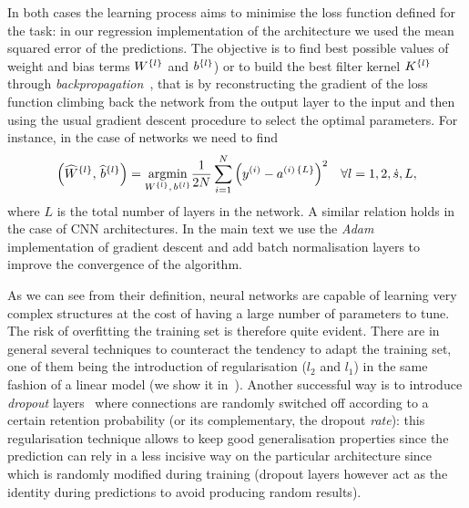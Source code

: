 In both cases the learning process aims to minimise the loss function defined for the task: in our regression implementation of the architecture we used the mean squared error of the predictions.
The objective is to find best possible values of weight and bias terms $W^{\qty{l}}$ and $b^{\qty{l}}$) or to build the best filter kernel $K^{\qty{l}}$ through \textit{backpropagation}~\cite{Rumelhart:1986:LearningRepresentationsBackpropagating}, that is by reconstructing the gradient of the loss function climbing back the network from the output layer to the input and then using the usual gradient descent procedure to select the optimal parameters.
For instance, in the case of \fc networks we need to find
\begin{equation}
  \qty( \widehat{W}^{\qty{l}},\, \widehat{b}^{\qty{l}} )
  =
  \underset{W^{\qty{l}},\, b^{\qty{l}}}{\mathrm{argmin}} \frac{1}{2 N} \sum\limits_{i = 1}^{N} \qty( y^{(i)} - a^{(i)\, \qty{L}} )^2
  \quad
  \forall l = 1, 2, \dot{s}, L,
\end{equation}
where $L$ is the total number of layers in the network.
A similar relation holds in the case of CNN architectures.
In the main text we use the \textit{Adam}~\cite{Kingma:2017:AdamMethodStochastic} implementation of gradient descent and add batch normalisation layers to improve the convergence of the algorithm.

As we can see from their definition, neural networks are capable of learning very complex structures at the cost of having a large number of parameters to tune.
The risk of overfitting the training set is therefore quite evident.
There are in general several techniques to counteract the tendency to adapt the training set, one of them being the introduction of regularisation ($l_2$ and $l_1$) in the same fashion of a linear model (we show it in~).
Another successful way is to introduce \textit{dropout} layers~\cite{Srivastava:2014:DropoutSimpleWay} where connections are randomly switched off according to a certain retention probability (or its complementary, the dropout \textit{rate}): this regularisation technique allows to keep good generalisation properties since the prediction can rely in a less incisive way on the particular architecture since which is randomly modified during training (dropout layers however act as the identity during predictions to avoid producing random results).


